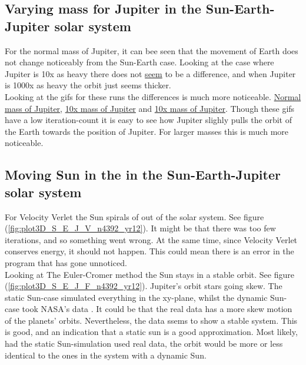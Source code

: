 \documentclass{article}
\begin{document}
\subsection{Varying mass for Jupiter in the Sun-Earth-Jupiter solar system} \label{sec:massSEJ}

    For the normal mass of Jupiter, it can bee seen that the movement of Earth does not change noticeably from the Sun-Earth case. Looking at the case where Jupiter is 10x as heavy there does not \underline{seem} to be a difference, and when Jupiter is 1000x as heavy the orbit just seems thicker.\\

    Looking at the gifs for these runs the differences is much more noticeable. \href{https://github.com/Erikbgram/Fys3150/blob/master/Project\%205/img/ani3D_S_E_J_V_n144_yr12.gif}{Normal mass of Jupiter}, \href{https://github.com/Erikbgram/Fys3150/blob/master/Project\%205/img/ani3D_S_E_J_V_m10_n144_yr12.gif}{10x mass of Jupiter} and \href{https://github.com/Erikbgram/Fys3150/blob/master/Project\%205/img/ani3D_S_E_J_V_m1000_n144_yr12.gif}{10x mass of Jupiter}.
    Though these gifs have a low iteration-count it is easy to see how Jupiter slighly pulls the orbit of the Earth towards the position of Jupiter. For larger masses this is much more noticeable.

\subsection{Moving Sun in the in the Sun-Earth-Jupiter solar system}

    For Velocity Verlet the Sun spirals of out of the solar system. See figure (\ref{fig:plot3D_S_E_J_V_n4392_yr12}). It might be that there was too few iterations, and so something went wrong. At the same time, since Velocity Verlet conserves energy, it should not happen. This could mean there is an error in the program that has gone unnoticed.\\

    Looking at The Euler-Cromer method the Sun stays in a stable orbit. See figure (\ref{fig:plot3D_S_E_J_F_n4392_yr12}). Jupiter's orbit stars going skew. The static Sun-case simulated everything in the xy-plane, whilst the dynamic Sun-case took NASA's data \cite{solarsystemdata}. It could be that the real data has a more skew motion of the planets' orbits. Nevertheless, the data ssems to show a stable system. This is good, and an indication that a static sun is a good approximation. Most likely, had the static Sun-simulation used real data, the orbit would be more or less identical to the ones in the system with a dynamic Sun.
\end{document}
